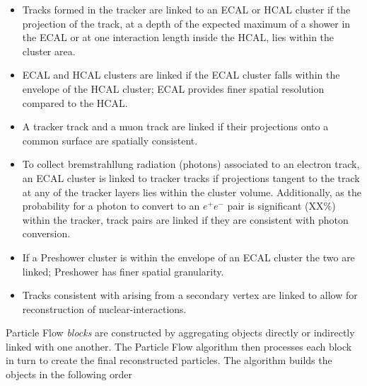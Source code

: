 \begin{itemize}
\item Tracks formed in the tracker are linked to an ECAL or HCAL cluster if the projection of the track, at a depth of the expected maximum of a shower in the ECAL or at one interaction length inside the HCAL, lies within the cluster area.
\item ECAL and HCAL clusters are linked if the ECAL cluster falls within the envelope of the HCAL cluster; ECAL provides finer spatial resolution compared to the HCAL.
\item A tracker track and a muon track are linked if their projections onto a common surface are spatially consistent.
\item To collect bremstrahllung radiation (photons) associated to an electron track, an ECAL cluster is linked to tracker tracks if projections tangent to the track at any of the tracker layers lies within the cluster volume. Additionally, as the probability for a photon to convert to an $e^{+}e^{-}$ pair is significant (XX\%) within the tracker, track pairs are linked if they are consistent with photon conversion.
\item If a Preshower cluster is within the envelope of an ECAL cluster the two are linked; Preshower has finer spatial granularity.
\item Tracks consistent with arising from a secondary vertex are linked to allow for reconstruction of nuclear-interactions.
\end{itemize}

Particle Flow \textit{blocks} are constructed by aggregating objects directly or indirectly linked with one another. The Particle Flow algorithm then processes each block in turn to create the final reconstructed particles. The algorithm builds the objects in the following order

